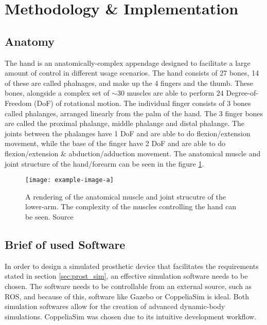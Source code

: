 \documentclass[../main.tex]{subfiles}
\begin{document}
\section{Methodology \& Implementation}

\subsection{Anatomy}
\label{sec:anatomy}

The hand is an anatomically-complex appendage designed to facilitate a large amount of control in different usage scenarios.
The hand consists of 27 bones, 14 of these are called phalnages, and make up the 4 fingers and the thumb.
These bones, alongside a complex set of $\sim30$ muscles are able to perform $24$ Degree-of-Freedom (DoF) of rotational motion.
The individual finger consists of 3 bones called \gls{phalanges}, arranged linearly from the palm of the hand.
The 3 finger bones are called the proximal phalange, middle phalange and distal phalange.
The joints between the phalanges have 1 DoF and are able to do \gls{flexion/extension} movement, while the base of the finger have 2 DoF and are able to do \gls{flexion/extension} \& \gls{abduction/adduction} movement.
The anatomical muscle and joint structure of the hand/forearm can be seen in the figure \ref{fig:anatomy}.

\begin{figure}[h]
\begin{center}
\texttt{[image: example-image-a]}
\caption{A rendering of the anatomical muscle and joint strucutre of the lower-arm. The complexity of the muscles controlling the hand can be seen. Source \cite{???}}
\label{fig:anatomy}
\end{center}
\end{figure}

\subsection{Brief of used Software}
\label{sec:software}

In order to design a simulated prosthetic device that facilitates the requirements stated in section \ref{sec:prost_sim}, an effective simulation software needs to be chosen.
The software needs to be controllable from an external source, such as ROS, and because of this, software like Gazebo \cite{gazebo} or CoppeliaSim \cite{coppeliasim} is ideal.
Both simulation softwares allow for the creation of advanced dynamic-body simulations.
CoppeliaSim \cite{coppeliasim} was chosen due to its intuitive development workflow.
\end{document}
